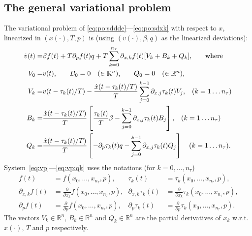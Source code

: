 \documentclass[11pt]{scrartcl}
\newcommand{\R}{\mathbb{R}}
\begin{document}
\subsection{The general variational problem}
\label{sec:vp}
 The variational problem of
\eqref{eq:po:sddde}---\eqref{eq:po:sdxk} with respect to $x$,
linearized in $(x(\cdot),T,p)$ is (using $(v(\cdot),\beta,q)$ as the
linearized deviations):
\begin{align}\allowdisplaybreaks
  \dot v(t)=&\beta
  f(t)+T\partial_{p}f(t)q+
  T\sum_{k=0}^{n_\tau}\partial_{x,k}f(t)[V_k+B_k+Q_k]\label{eq:vp}
  \mbox{,\qquad where}\\
  V_0=&v(t)\mbox{,}\qquad
  B_0=0\mbox{\quad ($\in\R^n)$,}\qquad
  Q_0=0\mbox{\quad ($\in\R^n)$,}\\
  V_k=&v(t-\tau_k(t)/T)-\frac{\dot
    x(t-\tau_k(t)/T)}{T}\sum_{j=0}^{k-1}\partial_{x,j}
  \tau_k(t)V_j\mbox{,\quad($k=1\ldots n_\tau$)}\\
  B_k=&\frac{\dot x(t-\tau_k(t)/T)}{T}\left[\frac{\tau_k(t)}{T}\beta-
    \sum_{j=0}^{k-1}\partial_{x,j} \tau_k(t)B_j\right]\mbox{,\quad($k=1\ldots n_\tau$)}\\
  Q_k=&\frac{\dot x(t-\tau_k(t)/T)}{T}\left[-\partial_p\tau_k(t)q-
    \sum_{j=0}^{k-1}\partial_{x,j}
    \tau_k(t)Q_j\right]\mbox{\quad($k=1\ldots
    n_\tau$).}\label{eq:vp:qk}
\end{align}
System~\eqref{eq:vp}---\eqref{eq:vp:qk} uses the notations (for
$k=0,\ldots,n_\tau$)
\begin{align}
    f(t)&=f\left(x_0,\ldots,x_{n_\tau},p\right)\mbox{,}&
    \tau_k(t)&=\tau_k\left(x_0,\ldots,x_{n_\tau},p\right)\mbox{,}\nonumber\\
    \partial_{x,k}f(t)&=\frac{\partial}{\partial
      x_k}f\left(x_0,\ldots,x_{n_\tau},p\right)\mbox{,}&
    \partial_{x,k}\tau_k(t)&=\frac{\partial}{\partial
      x_k}\tau_k\left(x_0,\ldots,x_{n_\tau},p\right)\mbox{,}\label{eq:vp:ft}\\
    \partial_pf(t)&=\frac{\partial}{\partial
      p}f\left(x_0,\ldots,x_{n_\tau},p\right)\mbox{,}&
    \partial_p\tau_k(t)&=\frac{\partial}{\partial
      p}\tau_k\left(x_0,\ldots,x_{n_\tau},p\right)\mbox{.}\nonumber
\end{align}
The vectors $V_k\in\R^n$, $B_k\in\R^n$ and $Q_k\in\R^n$ are the
partial derivatives of $x_k$ w.r.t.\ $x(\cdot)$, $T$ and $p$
respectively.
\end{document}
